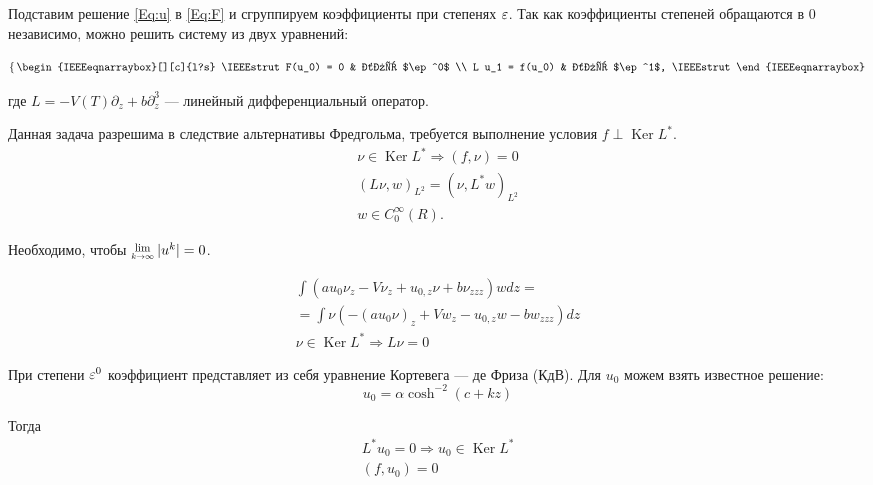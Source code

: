 Подставим решение \eqref{Eq:u} в \eqref{Eq:F}
и сгруппируем коэффициенты при степенях $\varepsilon$.
Так как коэффициенты степеней обращаются в 0 независимо,
можно решить систему из двух уравнений:

\begin{equation} \label{Eq:system}
    \left\{ \,
    \begin{IEEEeqnarraybox}[][c]{l?s}
        \IEEEstrut
            F(u_0) = 0 & для $\ep^0$ \\
            L u_1 = f(u_0) & для $\ep^1$,
        \IEEEstrut
    \end{IEEEeqnarraybox}
    \right.
\end{equation}

где $L = -V(T) \partial_z + b \partial_z^3$
--- линейный дифференциальный оператор.

Данная задача разрешима в следствие альтернативы Фредгольма,
требуется выполнение условия $f \perp \operatorname{Ker}L^*$.
\begin{equation*}
    \begin{gathered}
        \nu \in \operatorname{Ker}L^* \Rightarrow (f, \nu) = 0 \\
        (L \nu, w)_{L^2} = (\nu, L^* w)_{L^2} \\
        w \in C_0^\infty(R).
    \end{gathered}
\end{equation*}

Необходимо, чтобы $\Lim{k \rightarrow \infty} |u^k| = 0$.

\begin{equation*}
    \begin{gathered}
        \int \left(a u_0 \nu_z - V \nu_z + u_{0,z} \nu + b \nu_{zzz} \right) w dz = \\
        = \int \nu \left( -(a u_0 \nu)_z + V w_z - u_{0,z} w - b w_{zzz} \right) dz \\
        \nu \in \operatorname{Ker}L^* \Rightarrow L \nu = 0
    \end{gathered}
\end{equation*}

При степени $\varepsilon^0$ коэффициент
представляет из себя уравнение Кортевега --- де Фриза (КдВ).
Для $u_0$ можем взять известное решение:
\begin{equation*}
    u_0 = \alpha \cosh^{-2}(c + k z) 
\end{equation*}

Тогда
\begin{equation*}
    \begin{gathered}
        L^* u_0 = 0 \Rightarrow u_0 \in \operatorname{Ker}L^* \\
        (f, u_0) = 0
    \end{gathered}
\end{equation*}

